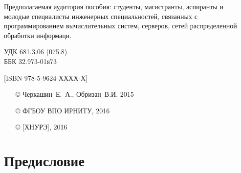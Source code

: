 \documentclass[14pt, a4paper, openany, twoside, final]{extbook} %
\newcommand{\e}[2][fcolor]{\textcolor{pcolor}{[}\textcolor{#1}{#2}\textcolor{pcolor}{]}}
\begin{document}
\begin{mygroup}
\begin{minipage}[t]{0.95\linewidth}
Предполагаемая аудитория пособия: студенты, магистранты, аспиранты и молодые специалисты инженерных специальностей, связанных с программированием вычислительных систем, серверов, сетей распределенной обработки информаци.

\mbox{}
\endgroup
\end{minipage}
\mbox{}\hspace{0.7\linewidth}
\begin{minipage}{0.3\linewidth}\small
\noindent УДК 681.3.06 (075.8)\\
\noindent ББК 32.973-01я73
\end{minipage}

\vfill
\noindent\begin{minipage}[t]{0.35\linewidth}\small
\noindent \e{ISBN 978-5-9624-ХХХХ-Х}
\end{minipage}%
\begin{minipage}[t]{0.65\linewidth}\small
\begin{itemize}
\setlength{\itemsep}{-0.5ex}
\setlength{\parsep}{0pt}
\item[\copyright{}] Черкашин~Е.~А., Обризан~В.И. 2015
\item[\copyright{}] ФГБОУ ВПО ИРНИТУ, 2016
\item[\copyright{}] \e{ХНУРЭ}, 2016
\end{itemize}
\end{minipage}
\end{mygroup}
\clearpage
\tableofcontents
\clearpage

\newpage
\chapter*{Предисловие}

\end{document}
